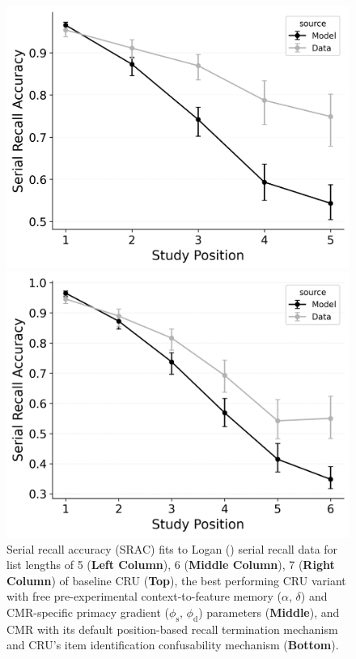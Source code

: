\documentclass[
  man,
  floatsintext,
  longtable,
  nolmodern,
  notxfonts,
  notimes,
  draftfirst,
  colorlinks=true,linkcolor=blue,citecolor=blue,urlcolor=blue]{apa7}
\begin{document}
\begin{figure}

\caption{\label{fig-serial-srac}Serial recall accuracy (SRAC) fits to
Logan () serial recall data for list
lengths of 5 (\textbf{Left Column}), 6 (\textbf{Middle Column}), 7
(\textbf{Right Column}) of baseline CRU (\textbf{Top}), the best
performing CRU variant with free pre-experimental context-to-feature
memory (\(\alpha\), \(\delta\)) and CMR-specific primacy gradient
(\(\phi_\text{s}\), \(\phi_\text{d}\)) parameters (\textbf{Middle}), and
CMR with its default position-based recall termination mechanism and
CRU's item identification confusability mechanism (\textbf{Bottom}).}

\begin{minipage}{0.33\linewidth}
\includegraphics{figures/bw_Gordon2021_BaseCRU_Confusable_Fitting_srac_LL5.png}\end{minipage}%
%
\begin{minipage}{0.33\linewidth}
\includegraphics{figures/bw_Gordon2021_BaseCRU_Confusable_Fitting_srac_LL6.png}\end{minipage}%

\end{figure}
\end{document}
